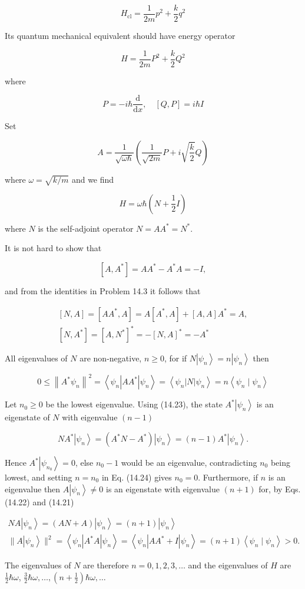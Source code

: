 \documentclass[10pt]{article}
\begin{document}
$$
H_{\mathrm{cl}}=\frac{1}{2 m} p^{2}+\frac{k}{2} q^{2}
$$

Its quantum mechanical equivalent should have energy operator

$$
H=\frac{1}{2 m} P^{2}+\frac{k}{2} Q^{2}
$$

where

$$
P=-i \hbar \frac{\mathrm{d}}{\mathrm{d} x}, \quad[Q, P]=i \hbar I
$$

Set

$$
A=\frac{1}{\sqrt{\omega \hbar}}\left(\frac{1}{\sqrt{2 m}} P+i \sqrt{\frac{k}{2}} Q\right)
$$

where $\omega=\sqrt{k / m}$ and we find

$$
H=\omega \hbar\left(N+\frac{1}{2} I\right)
$$

where $N$ is the self-adjoint operator $N=A A^{*}=N^{*}$.

It is not hard to show that

$$
\left[A, A^{*}\right]=A A^{*}-A^{*} A=-I,
$$

and from the identities in Problem 14.3 it follows that

$$
\begin{gathered}
{[N, A]=\left[A A^{*}, A\right]=A\left[A^{*}, A\right]+[A, A] A^{*}=A,} \\
{\left[N, A^{*}\right]=\left[A, N^{*}\right]^{*}=-[N, A]^{*}=-A^{*}}
\end{gathered}
$$

All eigenvalues of $N$ are non-negative, $n \geq 0$, for if $N\left|\psi_{n}\right\rangle=n\left|\psi_{n}\right\rangle$ then

$$
0 \leq\left\|A^{*} \psi_{n}\right\|^{2}=\left\langle\psi_{n}\left|A A^{*}\right| \psi_{n}\right\rangle=\left\langle\psi_{n}|N| \psi_{n}\right\rangle=n\left\langle\psi_{n} \mid \psi_{n}\right\rangle
$$

Let $n_{0} \geq 0$ be the lowest eigenvalue. Using (14.23), the state $A^{*}\left|\psi_{n}\right\rangle$ is an eigenstate of $N$ with eigenvalue $(n-1)$

$$
N A^{*}\left|\psi_{n}\right\rangle=\left(A^{*} N-A^{*}\right)\left|\psi_{n}\right\rangle=(n-1) A^{*}\left|\psi_{n}\right\rangle .
$$

Hence $A^{*}\left|\psi_{n_{0}}\right\rangle=0$, else $n_{0}-1$ would be an eigenvalue, contradicting $n_{0}$ being lowest, and setting $n=n_{0}$ in Eq. (14.24) gives $n_{0}=0$. Furthermore, if $n$ is an eigenvalue then $A\left|\psi_{n}\right\rangle \neq 0$ is an eigenstate with eigenvalue $(n+1)$ for, by Eqs. (14.22) and (14.21)

$$
\begin{gathered}
N A\left|\psi_{n}\right\rangle=(A N+A)\left|\psi_{n}\right\rangle=(n+1)\left|\psi_{n}\right\rangle \\
\| A\left|\psi_{n}\right\rangle \|^{2}=\left\langle\psi_{n}\left|A^{*} A\right| \psi_{n}\right\rangle=\left\langle\psi_{n}\left|A A^{*}+I\right| \psi_{n}\right\rangle=(n+1)\left\langle\psi_{n} \mid \psi_{n}\right\rangle>0 .
\end{gathered}
$$

The eigenvalues of $N$ are therefore $n=0,1,2,3, \ldots$ and the eigenvalues of $H$ are $\frac{1}{2} \hbar \omega$, $\frac{3}{2} \hbar \omega, \ldots,\left(n+\frac{1}{2}\right) \hbar \omega, \ldots$
\end{document}
